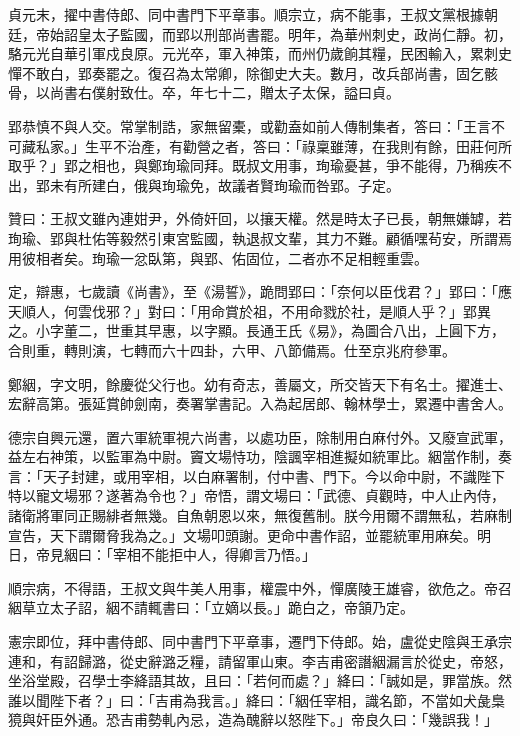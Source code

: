 \begin{pinyinscope}
 貞元末，擢中書侍郎、同中書門下平章事。順宗立，病不能事，王叔文黨根據朝廷，帝始詔皇太子監國，而郢以刑部尚書罷。明年，為華州刺史，政尚仁靜。初，駱元光自華引軍戍良原。元光卒，軍入神策，而州仍歲餉其糧，民困輸入，累刺史憚不敢白，郢奏罷之。復召為太常卿，除御史大夫。數月，改兵部尚書，固乞骸骨，以尚書右僕射致仕。卒，年七十二，贈太子太保，謚曰貞。



 郢恭慎不與人交。常掌制誥，家無留橐，或勸盍如前人傳制集者，答曰：「王言不可藏私家。」生平不治產，有勸營之者，答曰：「祿稟雖薄，在我則有餘，田莊何所取乎？」郢之相也，與鄭珣瑜同拜。既叔文用事，珣瑜憂甚，爭不能得，乃稱疾不出，郢未有所建白，俄與珣瑜免，故議者賢珣瑜而咎郢。子定。



 贊曰：王叔文雖內連姏尹，外倚奸回，以攘天權。然是時太子已長，朝無嫌罅，若珣瑜、郢與杜佑等毅然引東宮監國，執退叔文輩，其力不難。顧循嘿茍安，所謂焉用彼相者矣。珣瑜一忿臥第，與郢、佑固位，二者亦不足相輕重雲。



 定，辯惠，七歲讀《尚書》，至《湯誓》，跪問郢曰：「奈何以臣伐君？」郢曰：「應天順人，何雲伐邪？」對曰：「用命賞於祖，不用命戮於社，是順人乎？」郢異之。小字董二，世重其早惠，以字顯。長通王氏《易》，為圖合八出，上圓下方，合則重，轉則演，七轉而六十四卦，六甲、八節備焉。仕至京兆府參軍。



 鄭絪，字文明，餘慶從父行也。幼有奇志，善屬文，所交皆天下有名士。擢進士、宏辭高第。張延賞帥劍南，奏署掌書記。入為起居郎、翰林學士，累遷中書舍人。



 德宗自興元還，置六軍統軍視六尚書，以處功臣，除制用白麻付外。又廢宣武軍，益左右神策，以監軍為中尉。竇文場恃功，陰諷宰相進擬如統軍比。絪當作制，奏言：「天子封建，或用宰相，以白麻署制，付中書、門下。今以命中尉，不識陛下特以寵文場邪？遂著為令也？」帝悟，謂文場曰：「武德、貞觀時，中人止內侍，諸衛將軍同正賜緋者無幾。自魚朝恩以來，無復舊制。朕今用爾不謂無私，若麻制宣告，天下謂爾脅我為之。」文場叩頭謝。更命中書作詔，並罷統軍用麻矣。明日，帝見絪曰：「宰相不能拒中人，得卿言乃悟。」



 順宗病，不得語，王叔文與牛美人用事，權震中外，憚廣陵王雄睿，欲危之。帝召絪草立太子詔，絪不請輒書曰：「立嫡以長。」跪白之，帝頷乃定。



 憲宗即位，拜中書侍郎、同中書門下平章事，遷門下侍郎。始，盧從史陰與王承宗連和，有詔歸潞，從史辭潞乏糧，請留軍山東。李吉甫密譖絪漏言於從史，帝怒，坐浴堂殿，召學士李絳語其故，且曰：「若何而處？」絳曰：「誠如是，罪當族。然誰以聞陛下者？」曰：「吉甫為我言。」絳曰：「絪任宰相，識名節，不當如犬彘梟獍與奸臣外通。恐吉甫勢軋內忌，造為醜辭以怒陛下。」帝良久曰：「幾誤我！」




\end{pinyinscope}
